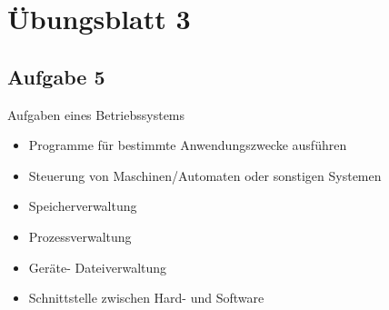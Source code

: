 
\section*{Übungsblatt 3}
\setcounter{section}{1}

\subsection*{Aufgabe 5}

Aufgaben eines Betriebssystems
\begin{itemize}
  \item Programme für bestimmte Anwendungszwecke ausführen
  \item Steuerung von Maschinen/Automaten oder sonstigen Systemen
  \item Speicherverwaltung
  \item Prozessverwaltung 
  \item Geräte- Dateiverwaltung
  \item Schnittstelle zwischen Hard- und Software
\end{itemize}

